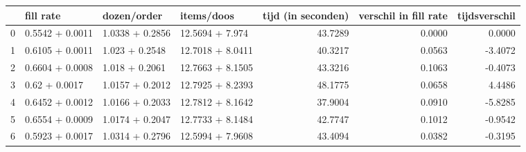 \begin{tabular}{llllrrr}
\toprule
{} &        fill rate &      dozen/order &        items/doos &  tijd (in seconden) &  verschil in fill rate &  tijdsverschil \\
\midrule
0 &  0.5542 + 0.0011 &  1.0338 + 0.2856 &   12.5694 + 7.974 &             43.7289 &                 0.0000 &         0.0000 \\
1 &  0.6105 + 0.0011 &   1.023 + 0.2548 &  12.7018 + 8.0411 &             40.3217 &                 0.0563 &        -3.4072 \\
2 &  0.6604 + 0.0008 &   1.018 + 0.2061 &  12.7663 + 8.1505 &             43.3216 &                 0.1063 &        -0.4073 \\
3 &    0.62 + 0.0017 &  1.0157 + 0.2012 &  12.7925 + 8.2393 &             48.1775 &                 0.0658 &         4.4486 \\
4 &  0.6452 + 0.0012 &  1.0166 + 0.2033 &  12.7812 + 8.1642 &             37.9004 &                 0.0910 &        -5.8285 \\
5 &  0.6554 + 0.0009 &  1.0174 + 0.2047 &  12.7733 + 8.1484 &             42.7747 &                 0.1012 &        -0.9542 \\
6 &  0.5923 + 0.0017 &  1.0314 + 0.2796 &  12.5994 + 7.9608 &             43.4094 &                 0.0382 &        -0.3195 \\
\bottomrule
\end{tabular}
